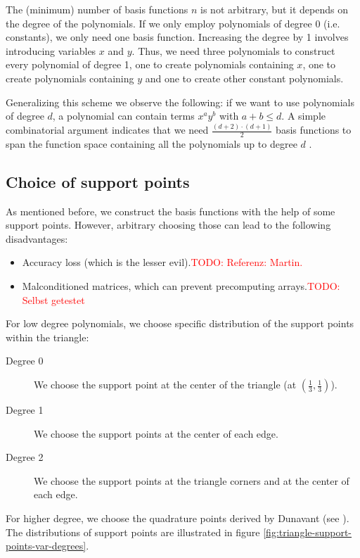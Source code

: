 \documentclass{article}
\newcommand{\todo}[2][]{\textcolor{red}{TODO\ifthenelse{\equal{#1}{}}{}{[#1]}: #2}}
\begin{document}
The (minimum) number of basis functions $n$ is not arbitrary, but it depends on the degree of the polynomials. If we only employ polynomials of degree 0 (i.e.\,constants), we only need one basis function. Increasing the degree by 1 involves introducing variables $x$ and $y$. Thus, we need three polynomials to construct every polynomial of degree 1, one to create polynomials containing $x$, one to create polynomials containing $y$ and one to create other constant polynomials.

Generalizing this scheme we observe the following: if we want to use polynomials of degree $d$, a polynomial can contain terms $x^a y^b$ with $a+b \leq d$. A simple combinatorial argument indicates that we need $\frac{(d+2) \cdot (d+1)}{2}$ basis functions to span the function space containing all the polynomials up to degree $d$ .


\subsection{Choice of support points}
\label{sec:choice-support-points}

As mentioned before, we construct the basis functions with the help of some support points. However, arbitrary choosing those can lead to the following disadvantages:

\begin{itemize}
\item Accuracy loss (which is the lesser evil).\todo{Referenz: Martin.}
\item Malconditioned matrices, which can prevent precomputing arrays.\todo{Selbst getestet}
\end{itemize}


For low degree polynomials, we choose specific distribution of the support points within the triangle:
\begin{description}
\item[Degree 0] We choose the support point at the center of the triangle (at $\left(\frac{1}{3}, \frac{1}{3}\right)$).
\item[Degree 1] We choose the support points at the center of each edge.
\item[Degree 2] We choose the support points at the triangle corners and at the center of each edge.
\end{description}

For higher degree, we choose the quadrature points derived by Dunavant (see \cite{dunavant1985high}). The distributions of support points are illustrated in figure \ref{fig:triangle-support-points-var-degrees}.
\end{document}
